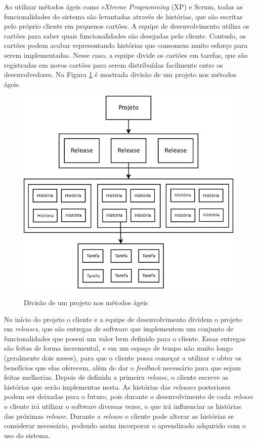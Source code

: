 Ao utilizar métodos ágeis como \textit{eXtreme Programming} (XP)  e Scrum, todas as funcionalidades do sistema são levantadas através de histórias, que são escritas pelo próprio cliente em pequenos cartões. A equipe de desenvolvimento utiliza os cartões para saber quais funcionalidades são desejadas pelo cliente. Contudo, os cartões podem acabar representando histórias que consomem muito esforço para serem implementadas. Nesse caso, a equipe divide os cartões em tarefas, que são registradas em novos cartões para serem distribuídas facilmente entre os desenvolvedores. Na Figura \ref{img:projeto_agile} é mostrada divisão de um projeto nos métodos ágeis.

\begin{figure}[h]
  \center
  \caption{Divisão de um projeto nos métodos ágeis}
  \includegraphics[scale=0.45]{images/projeto}
  \label{img:projeto_agile}
\end{figure}

No início do projeto o cliente e a equipe de desenvolvimento dividem o projeto em \textit{releases}, que são entregas de software que implementem um conjunto de funcionalidades que possui um valor bem definido para o cliente. Essas entregas são feitas de forma incremental, e em um espaço de tempo não muito longo (geralmente dois meses), para que o cliente possa começar a utilizar e obter os benefícios que elas oferecem, além de dar o \textit{feedback} necessário para que sejam feitas melhorias. Depois de definida a primeira \textit{release}, o cliente escreve as histórias que serão implementas nesta. As histórias das \textit{releases} posteriores podem ser deixadas para o futuro, pois durante o desenvolvimento de cada \textit{release} o cliente irá utilizar o software diversas vezes, o que irá influenciar as histórias das próximas \textit{release}. Durante a \textit{release} o cliente pode alterar as histórias se considerar necessário, podendo assim incorporar o aprendizado adquirido com o uso do sistema.

